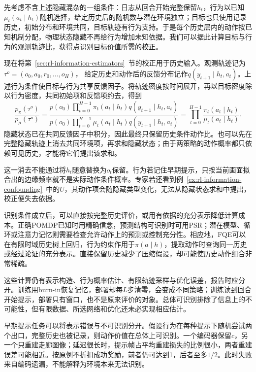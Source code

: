 先考虑不含上述隐藏混杂的一组条件：日志从回合开始完整保留$h_t$，行为以已知$\mu_t(a_t\mid h_t)$随机选择，给定历史后的随机数与潜在环境独立；目标也只使用记录历史，初始分布和环境共同，目标轨迹有行为支持。于是每个历史层内的动作按已知机制分配，物理状态隐藏不再给行为增加未知依据。我们可以据此计算目标与行为的观测轨迹比，获得点识别目标价值所需的校正。

现在将第~\ref{sec:rl-information-estimators}~节的校正用于历史输入。观测轨迹记为
$\tau^o=(o_0,a_0,r_0,\ldots,o_H)$，
给定历史和动作后的反馈分布记作$q(y_{t+1}\mid h_t,a_t)$。上述行为条件使目标与行为共享反馈因子。将轨迹密度按时间展开，再以目标密度除以行为密度，共同初始项和反馈项约去，得到
\begin{equation}
  \label{eq:rl-information-history-is}
  \frac{p_\pi(\tau^o)}{p_\mu(\tau^o)}
   =\frac{p(o_0)\prod_{t=0}^{H-1}
                  \pi_t(a_t\mid h_t)q(y_{t+1}\mid h_t,a_t)}
          {p(o_0)\prod_{t=0}^{H-1}
                  \mu_t(a_t\mid h_t)q(y_{t+1}\mid h_t,a_t)}
   =\prod_{t=0}^{H-1}\frac{\pi_t(a_t\mid h_t)}
                              {\mu_t(a_t\mid h_t)}.
\end{equation}
隐藏状态已在共同反馈因子中积分，因此最终只保留历史条件动作比。也可以先在完整隐藏轨迹上消去共同环境项，再求和隐藏状态；由于两策略的动作概率都只依赖可见历史，才能将它们提出该求和。

这一消去不能通过将$h_t$随意替换为$o_t$保留。行为若记住早期提示，只按当前画面拟合出的边缘频率就不是实际动作条件概率。专家若还看到例~\ref{ex:rl-information-confounding}~中的$U$，其动作项会随隐藏类型变化，无法从隐藏状态求和中提出，校正便失去依据。

识别条件成立后，可以直接按完整历史评价，或用有依据的充分表示降低计算成本。正确POMDP已知时用精确信念，预测结构可识别时可用PSR；潜在模型、循环或注意力记忆则需要检查允许动作上的预测或控制充分性。相应地，FQE可以在有限时域历史树上回归，行为约束作用于$\pi(a\mid h)$，提取动作时查询同一历史或经过论证的充分表示。直接保留历史减少了压缩假设，却可能使历史动作组合非常稀疏。

这些计算仍有表示构造、行为概率估计、有限轨迹采样与优化误差，报告时应分开。训练用burn-in恢复记忆，部署却每$L$步清零，会变成不同策略；训练读到回合开始提示，部署只有窗口，也不是原来评价的对象。总体可识别排除了信息上的不可能性，但有限数据、所选网络和优化还未必实现相应估计。

早期提示任务可以将表示错误与不可识别分开。假设行为在每种提示下随机尝试两个出口，完整历史也被记录，则动作价值在总体上可识别。一个编码器保留$c$，另一个只重建走廊图像；延迟很长时，提示帧占平均重建损失的比例很小，两者重建误差可能相近。按原例不折扣成功奖励，前者仍可达到1，后者至多$1/2$。此时失败来自编码遗漏，不能解释为环境本来无法识别。

